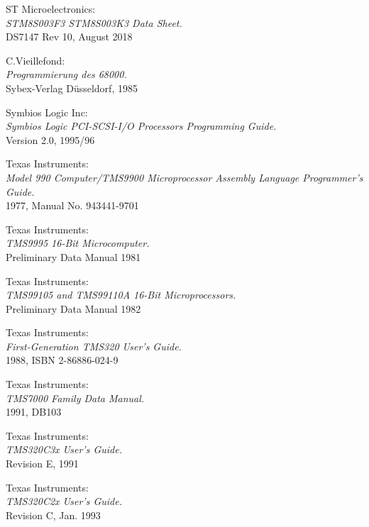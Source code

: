  ST Microelectronics: \\
                  {\em STM8S003F3 STM8S003K3 Data Sheet.\/} \\
                  DS7147 Rev 10, August 2018

 C.Vieillefond: \\
                 {\em Programmierung des 68000.\/} \\
                 Sybex-Verlag D\"usseldorf, 1985

 Symbios Logic Inc: \\
                 {\em Symbios Logic PCI-SCSI-I/O Processors Programming   
                 Guide.\/} \\
                 Version 2.0, 1995/96
                 
  Texas Instruments: \\
                 {\em Model 990 Computer/TMS9900 Microprocessor
                      Assembly Language Programmer's Guide.\/} \\
                 1977, Manual No. 943441-9701

 Texas Instruments: \\
                 {\em TMS9995 16-Bit Microcomputer.\/} \\
                 Preliminary Data Manual
                 1981

 Texas Instruments: \\
                 {\em TMS99105 and TMS99110A 16-Bit Microprocessors.\/} \\
                 Preliminary Data Manual
                 1982

 Texas Instruments: \\
                {\em First-Generation TMS320 User's Guide.\/} \\
                1988, ISBN 2-86886-024-9

 Texas Instruments: \\
                 {\em TMS7000 Family Data Manual.\/} \\
                 1991, DB103

 Texas Instruments: \\
                {\em TMS320C3x User's Guide.\/} \\
                Revision E, 1991

 Texas Instruments: \\
                {\em TMS320C2x User's Guide.\/} \\
                Revision C, Jan. 1993

